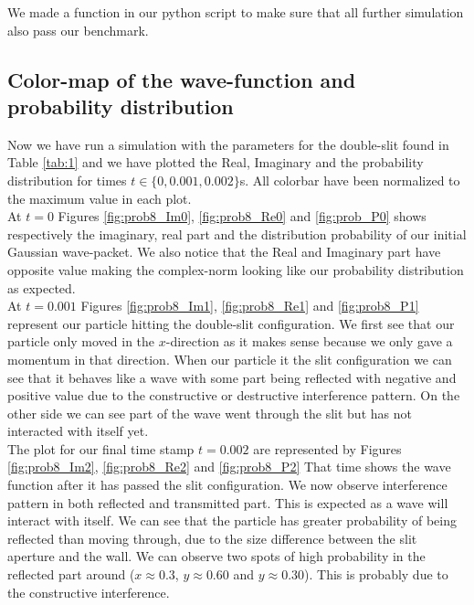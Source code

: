 \documentclass[english,notitlepage,reprint,nofootinbib]{revtex4-2}  %
\begin{document}
	We made a function in our python script to make sure that all further 
	simulation also pass our benchmark. 
	
	\subsection{Color-map of the wave-function and probability distribution}\label{subsec:colormap}
	
	Now we have run a simulation with the parameters for the double-slit found in
	Table \ref{tab:1} and we have plotted the Real, Imaginary and the probability
	distribution for times $t \in \{0, 0.001, 0.002 \}$s. All colorbar have been 
	normalized to the maximum value in each plot. \\
	
	At $t=0$ Figures \ref{fig:prob8_Im0}, \ref{fig:prob8_Re0} and \ref{fig:prob_P0}
	shows respectively the imaginary, real part and the distribution probability 
	of our initial Gaussian wave-packet. We also notice that the Real and Imaginary 
	part have opposite value making the complex-norm looking like our probability
	distribution as expected. \\
	
	At $t=0.001$ Figures \ref{fig:prob8_Im1}, \ref{fig:prob8_Re1} and \ref{fig:prob8_P1}
	represent our particle hitting the double-slit configuration. We first see that our 
	particle only moved in the $x$-direction as it makes sense because we only gave a 
	momentum in that direction. When our particle it the slit configuration we can see 
	that it behaves like a wave with some part being reflected with negative and positive 
	value due to the constructive or destructive interference pattern. On the other side
	we can see part of the wave went through the slit but has not interacted with itself 
	yet. \\ 
	
		
	The plot for our final time stamp $t=0.002$ are represented by 
	Figures \ref{fig:prob8_Im2}, \ref{fig:prob8_Re2} and \ref{fig:prob8_P2}
	That time shows the wave function after it has passed the slit configuration. 
	We now observe interference pattern in both reflected and transmitted part. This 
	is expected as a wave will interact with itself. We can see that the particle has
	greater probability of being reflected than moving through, due to the size difference
	between the slit aperture and the wall. We can observe two spots of high probability in 
	the reflected part around ($x\approx0.3$, $y\approx0.60$ and $y\approx0.30$). This is 
	probably due to the constructive interference. 
	
\end{document}
